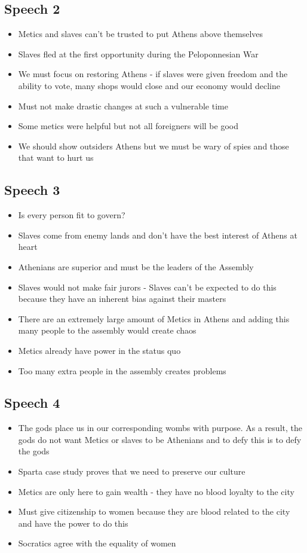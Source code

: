 \documentclass[11pt]{article}
\begin{document}
\subsection{Speech 2}
\label{sec:org410c621}
\begin{itemize}
\item Metics and slaves can't be trusted to put Athens above themselves
\item Slaves fled at the first opportunity during the Peloponnesian War
\item We must focus on restoring Athens - if slaves were given freedom and the ability to vote,
many shops would close and our economy would decline
\item Must not make drastic changes at such a vulnerable time
\item Some metics were helpful but not all foreigners will be good
\item We should show outsiders Athens but we must be wary of spies and those that want to hurt us
\end{itemize}
\subsection{Speech 3}
\label{sec:orgfd3171a}
\begin{itemize}
\item Is every person fit to govern?
\item Slaves come from enemy lands and don't have the best interest of Athens at heart
\item Athenians are superior and must be the leaders of the Assembly
\item Slaves would not make fair jurors - Slaves can't be expected to do this because they have 
an inherent bias against their masters
\item There are an extremely large amount of Metics in Athens and adding this many people to the
assembly would create chaos
\item Metics already have power in the status quo
\item Too many extra people in the assembly creates problems
\end{itemize}
\subsection{Speech 4}
\label{sec:orgdb5db44}
\begin{itemize}
\item The gods place us in our corresponding wombs with purpose. As a result, the gods do not want
Metics or slaves to be Athenians and to defy this is to defy the gods
\item Sparta case study proves that we need to preserve our culture
\item Metics are only here to gain wealth - they have no blood loyalty to the city
\item Must give citizenship to women because they are blood related to the city and have the power
to do this
\item Socratics agree with the equality of women
\end{itemize}
\end{document}
